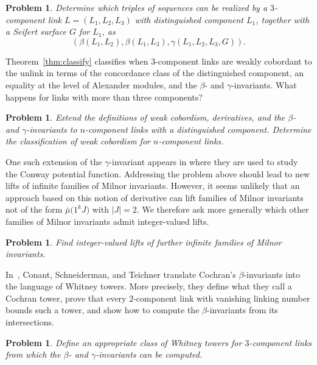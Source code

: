 \documentclass[a4paper, 11pt]{amsart}
\newtheorem{problem}[theorem]{Problem}
\theoremstyle{definition}
\begin{document}
\begin{problem}\label{problem: classify gamma sequences}
Determine which triples of sequences can be realized by a $3$-component link
$L=(L_1,L_2,L_3)$ with distinguished component $L_1$, together with a Seifert surface $G$ for $L_1$, as
\[
(\beta(L_1,L_2), \beta(L_1,L_3), \gamma(L_1,L_2,L_3,G)).
\]
\end{problem}

Theorem~\ref{thm:classify} classifies when $3$-component links are weakly cobordant to the unlink in terms of the concordance class of the distinguished component, an equality at the level of Alexander modules, and the $\beta$- and $\gamma$-invariants. What happens for links with more than three components?

\begin{problem}
Extend the definitions of weak cobordism, derivatives, and the $\beta$- and $\gamma$-invariants to $n$-component links with a distinguished component. Determine the classification of weak cobordism for $n$-component links.
\end{problem}

{One such extension of the $\gamma$-invariant appears in \cite[Theorem 1.2]{Tsukamoto-Yasuhara:2007} where they are used to study the Conway potential function.}  Addressing the problem above should lead to new lifts of infinite families of Milnor invariants. However, it seems unlikely that an approach based on this notion of derivative can lift families of Milnor invariants not of the form $\bar{\mu}({1^kJ)}$ with $|J|=2$. We therefore ask more generally which other families of Milnor invariants admit integer-valued lifts.

\begin{problem}
Find integer-valued lifts of further infinite families of Milnor invariants.
\end{problem}

In~\cite{CST:2017}, Conant, Schneiderman, and Teichner translate Cochran's $\beta$-invariants into the language of Whitney towers. More precisely, they define what they call a Cochran tower, prove that every $2$-component link with vanishing linking number bounds such a tower, and show how to compute the $\beta$-invariants from its intersections.

\begin{problem}
Define an appropriate class of Whitney towers for $3$-component links from which the $\beta$- and $\gamma$-invariants can be computed.
\end{problem}
\end{document}
